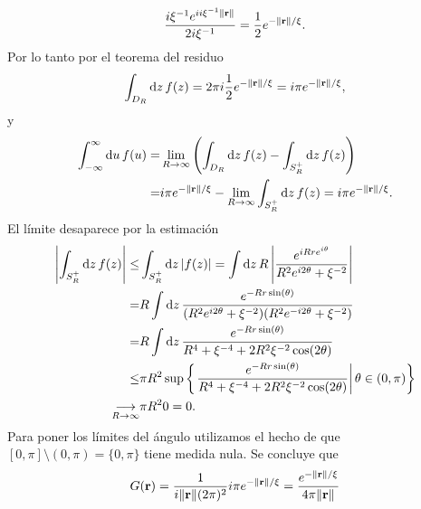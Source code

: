 \documentclass{article}
\begin{document}
\begin{enumerate}
\begin{equation}
\frac{i\xi^{-1}e^{ii\xi^{-1}\|\vb{r}\|}}{2i\xi^{-1}}=\frac{1}{2}e^{-\|\vb{r}\|/\xi}.
\end{equation}
Por lo tanto por el teorema del residuo
\begin{equation}
\int_{D_R}\dd{z}f(z)=2\pi i\frac{1}{2}e^{-\|\vb{r}\|/\xi}=i\pi e^{-\|\vb{r}\|/\xi},
\end{equation}
y
\begin{align}
\begin{split}
\int_{-\infty}^\infty \dd{u}f(u)=&\lim_{R\rightarrow\infty}\qty(\int_{D_R}\dd{z}f(z)-\int_{S^+_R}\dd{z}f(z))\\
=&i\pi e^{-\|\vb{r}\|/\xi}-\lim_{R\rightarrow\infty}\int_{S^+_R}\dd{z}f(z)=i\pi e^{-\|\vb{r}\|/\xi}.
\end{split}
\end{align}
El límite desaparece por la estimación
\begin{align}
\begin{split}
\left\vert\int_{S^+_R}\dd{z}f(z)\right\vert\leq&\int_{S^+_R}\dd{z}|f(z)|=\int\dd{z}R\left\vert \frac{e^{iRre^{i\theta}}}{R^2e^{i2\theta}+\xi^{-2}}\right\vert\\
=&R\int\dd{z}\frac{e^{-Rr\sin(\theta)}}{(R^2e^{i2\theta}+\xi^{-2})(R^2e^{-i2\theta}+\xi^{-2})}\\
=&R\int\dd{z}\frac{e^{-Rr\sin(\theta)}}{R^4+\xi^{-4}+2R^2\xi^{-2}\cos(2\theta)}\\
\leq&\pi R^2\sup\qty{\left.\frac{e^{-Rr\sin(\theta)}}{R^4+\xi^{-4}+2R^2\xi^{-2}\cos(2\theta)}\right\vert\theta\in\qty(0,\pi)}\\
\underset{R\rightarrow\infty}{\longrightarrow}&\pi R^2 0=0.
\end{split}
\end{align}
Para poner los límites del ángulo utilizamos el hecho de que $[0,\pi]\setminus(0,\pi)=\{0,\pi\}$ tiene medida nula. Se concluye que
\begin{equation}\label{ec:correlacion_3}
G(\vb{r})=\frac{1}{i\|\vb{r}\|(2\pi)^2}i\pi e^{-\|\vb{r}\|/\xi}=\frac{e^{-\|\vb{r}\|/\xi}}{4\pi\|\vb{r}\|}
\end{equation}


\end{enumerate}
\end{document}
